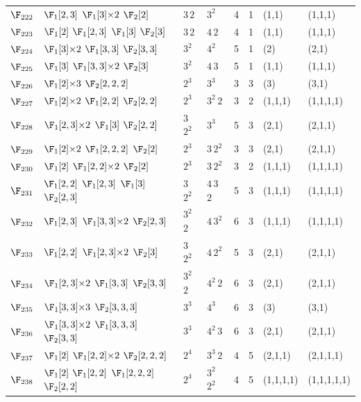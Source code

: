 \begin{landscape}
{\begin{longtable}{@{}l p{8.2cm} l l r r l l@{}}
$\F_{222}$ & $\F_{1}[2,3]$\; $\F_{1}[3]{\times}2$\; $\F_{2}[2]$ & $3$\,$2$ & $3^{2}$ & 4 & 1 & (1,1) & (1,1,1) \\
$\F_{223}$ & $\F_{1}[2]$\; $\F_{1}[2,3]$\; $\F_{1}[3]$\; $\F_{2}[3]$ & $3$\,$2$ & $4$\,$2$ & 4 & 1 & (1,1) & (1,1,1) \\
$\F_{224}$ & $\F_{1}[3]{\times}2$\; $\F_{1}[3,3]$\; $\F_{2}[3,3]$ & $3^{2}$ & $4^{2}$ & 5 & 1 & (2) & (2,1) \\
$\F_{225}$ & $\F_{1}[3]$\; $\F_{1}[3,3]{\times}2$\; $\F_{2}[3]$ & $3^{2}$ & $4$\,$3$ & 5 & 1 & (1,1) & (1,1,1) \\
$\F_{226}$ & $\F_{1}[2]{\times}3$\; $\F_{2}[2,2,2]$ & $2^{3}$ & $3^{3}$ & 3 & 3 & (3) & (3,1) \\
$\F_{227}$ & $\F_{1}[2]{\times}2$\; $\F_{1}[2,2]$\; $\F_{2}[2,2]$ & $2^{3}$ & $3^{2}$\,$2$ & 3 & 2 & (1,1,1) & (1,1,1,1) \\
$\F_{228}$ & $\F_{1}[2,3]{\times}2$\; $\F_{1}[3]$\; $\F_{2}[2,2]$ & $3$\,$2^{2}$ & $3^{3}$ & 5 & 3 & (2,1) & (2,1,1) \\
$\F_{229}$ & $\F_{1}[2]{\times}2$\; $\F_{1}[2,2,2]$\; $\F_{2}[2]$ & $2^{3}$ & $3$\,$2^{2}$ & 3 & 3 & (2,1) & (2,1,1) \\
$\F_{230}$ & $\F_{1}[2]$\; $\F_{1}[2,2]{\times}2$\; $\F_{2}[2]$ & $2^{3}$ & $3$\,$2^{2}$ & 3 & 2 & (1,1,1) & (1,1,1,1) \\
$\F_{231}$ & $\F_{1}[2,2]$\; $\F_{1}[2,3]$\; $\F_{1}[3]$\; $\F_{2}[2,3]$ & $3$\,$2^{2}$ & $4$\,$3$\,$2$ & 5 & 3 & (1,1,1) & (1,1,1,1) \\
$\F_{232}$ & $\F_{1}[2,3]$\; $\F_{1}[3,3]{\times}2$\; $\F_{2}[2,3]$ & $3^{2}$\,$2$ & $4$\,$3^{2}$ & 6 & 3 & (1,1,1) & (1,1,1,1) \\
$\F_{233}$ & $\F_{1}[2,2]$\; $\F_{1}[2,3]{\times}2$\; $\F_{2}[3]$ & $3$\,$2^{2}$ & $4$\,$2^{2}$ & 5 & 3 & (2,1) & (2,1,1) \\
$\F_{234}$ & $\F_{1}[2,3]{\times}2$\; $\F_{1}[3,3]$\; $\F_{2}[3,3]$ & $3^{2}$\,$2$ & $4^{2}$\,$2$ & 6 & 3 & (2,1) & (2,1,1) \\
$\F_{235}$ & $\F_{1}[3,3]{\times}3$\; $\F_{2}[3,3,3]$ & $3^{3}$ & $4^{3}$ & 6 & 3 & (3) & (3,1) \\
$\F_{236}$ & $\F_{1}[3,3]{\times}2$\; $\F_{1}[3,3,3]$\; $\F_{2}[3,3]$ & $3^{3}$ & $4^{2}$\,$3$ & 6 & 3 & (2,1) & (2,1,1) \\
$\F_{237}$ & $\F_{1}[2]$\; $\F_{1}[2,2]{\times}2$\; $\F_{2}[2,2,2]$ & $2^{4}$ & $3^{3}$\,$2$ & 4 & 5 & (2,1,1) & (2,1,1,1) \\
$\F_{238}$ & $\F_{1}[2]$\; $\F_{1}[2,2]$\; $\F_{1}[2,2,2]$\; $\F_{2}[2,2]$ & $2^{4}$ & $3^{2}$\,$2^{2}$ & 4 & 5 & (1,1,1,1) & (1,1,1,1,1) \\

\end{longtable}}
\end{landscape}
